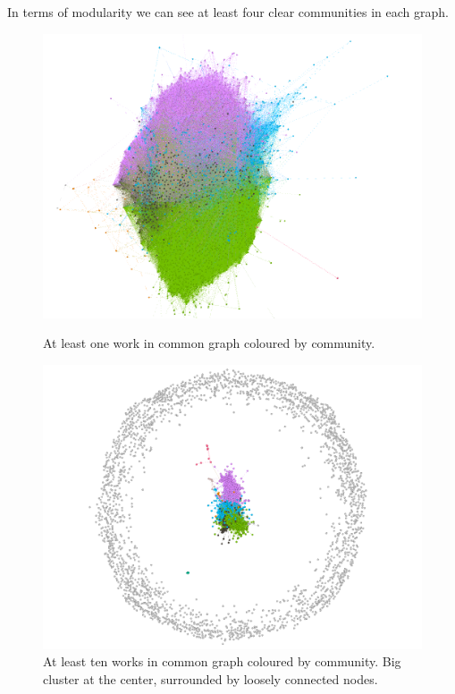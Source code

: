 In terms of modularity we can see at least four clear communities in each graph.
\begin{figure}[!hbt]
	\begin{center}
	\includegraphics[width=\columnwidth]{graphics/atLeast1WorkCommunity.png}
	\caption{At least one work in common graph coloured by community.}
	\label{fig:graph1CommunityColoured}

	\includegraphics[width=\columnwidth]{graphics/atLeast10WorksCommunity.png}
	\caption{At least ten works in common graph coloured by community. Big cluster at the center, surrounded by loosely connected nodes.}
	\label{fig:graph10CommunityColoured}
	\end{center}
\end{figure}

